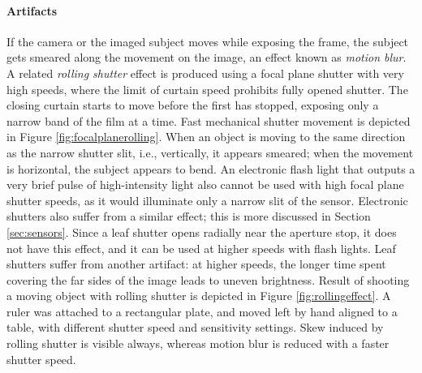 \paragraph{Artifacts}
If the camera or the imaged subject moves while exposing the frame, the subject gets smeared along the movement on the image, an effect known as \emph{motion blur}.
A related \emph{rolling shutter} effect is produced using a focal plane shutter with very high speeds, where the limit of curtain speed prohibits fully opened shutter.
The closing curtain starts to move before the first has stopped, exposing only a narrow band of the film at a time.
Fast mechanical shutter movement is depicted in Figure \ref{fig:focalplanerolling}.
When an object is moving to the same direction as the narrow shutter slit, i.e., vertically, it appears smeared;
when the movement is horizontal, the subject appears to bend.
An electronic flash light that outputs a very brief pulse of high-intensity light also cannot be used with high focal plane shutter speeds, as it would illuminate only a narrow slit of the sensor.
Electronic shutters also suffer from a similar effect; this is more discussed in Section \ref{sec:sensors}.
Since a leaf shutter opens radially near the aperture stop, it does not have this effect, and it can be used at higher speeds with flash lights.
Leaf shutters suffer from another artifact:
at higher speeds, the longer time spent covering the far sides of the image leads to uneven brightness.
Result of shooting a moving object with rolling shutter is depicted in Figure \ref{fig:rollingeffect}.
A ruler was attached to a rectangular plate, and moved left by hand aligned to a table, with different shutter speed and sensitivity settings.
Skew induced by rolling shutter is visible always, whereas motion blur is reduced with a faster shutter speed.


